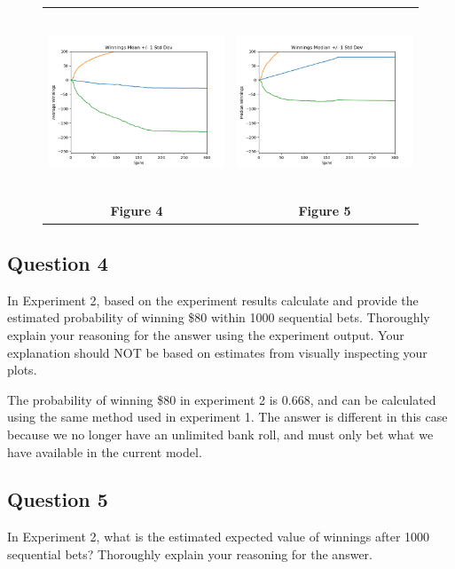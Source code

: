 \documentclass[
	letterpaper, %
]{jdf}
\begin{document}
\begin{figure}[h]
	\begin{tabular}{cc}
		\includegraphics[height=5.5cm]{figure_4.png} & \includegraphics[height=5.5cm]{figure_5.png} \\
		\textbf{Figure 4} & \textbf{Figure 5} \\
	\end{tabular}
\end{figure}


\subsection{Question 4}
In Experiment 2, based on the experiment results calculate and provide the estimated probability of winning \$80 within 1000 sequential bets. Thoroughly explain your reasoning for the answer using the experiment output. Your explanation should NOT be based on estimates from visually inspecting your plots. 

The probability of winning \$80 in experiment 2 is 0.668, and can be calculated using the same method used in experiment 1. The answer is different in this case because we no longer have an unlimited bank roll, and must only bet what we have available in the current model.

\subsection{Question 5}
In Experiment 2, what is the estimated expected value of winnings after 1000 sequential bets? Thoroughly explain your reasoning for the answer. 
\end{document}
